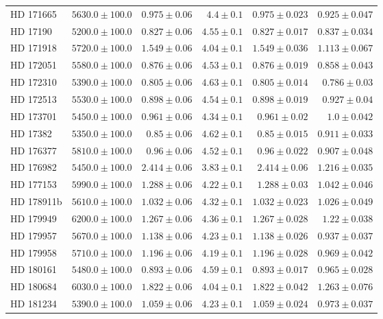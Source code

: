 \begin{longtable*}{lrrrrr}
HD 171665 & $5630.0\pm 100.0$ & $0.975\pm 0.06$ & $4.4\pm 0.1$ & $0.975\pm 0.023$ & $0.925\pm 0.047$ \\ 
HD 17190 & $5200.0\pm 100.0$ & $0.827\pm 0.06$ & $4.55\pm 0.1$ & $0.827\pm 0.017$ & $0.837\pm 0.034$ \\ 
HD 171918 & $5720.0\pm 100.0$ & $1.549\pm 0.06$ & $4.04\pm 0.1$ & $1.549\pm 0.036$ & $1.113\pm 0.067$ \\ 
HD 172051 & $5580.0\pm 100.0$ & $0.876\pm 0.06$ & $4.53\pm 0.1$ & $0.876\pm 0.019$ & $0.858\pm 0.043$ \\ 
HD 172310 & $5390.0\pm 100.0$ & $0.805\pm 0.06$ & $4.63\pm 0.1$ & $0.805\pm 0.014$ & $0.786\pm 0.03$ \\ 
HD 172513 & $5530.0\pm 100.0$ & $0.898\pm 0.06$ & $4.54\pm 0.1$ & $0.898\pm 0.019$ & $0.927\pm 0.04$ \\ 
HD 173701 & $5450.0\pm 100.0$ & $0.961\pm 0.06$ & $4.34\pm 0.1$ & $0.961\pm 0.02$ & $1.0\pm 0.042$ \\ 
HD 17382 & $5350.0\pm 100.0$ & $0.85\pm 0.06$ & $4.62\pm 0.1$ & $0.85\pm 0.015$ & $0.911\pm 0.033$ \\ 
HD 176377 & $5810.0\pm 100.0$ & $0.96\pm 0.06$ & $4.52\pm 0.1$ & $0.96\pm 0.022$ & $0.907\pm 0.048$ \\ 
HD 176982 & $5450.0\pm 100.0$ & $2.414\pm 0.06$ & $3.83\pm 0.1$ & $2.414\pm 0.06$ & $1.216\pm 0.035$ \\ 
HD 177153 & $5990.0\pm 100.0$ & $1.288\pm 0.06$ & $4.22\pm 0.1$ & $1.288\pm 0.03$ & $1.042\pm 0.046$ \\ 
HD 178911b & $5610.0\pm 100.0$ & $1.032\pm 0.06$ & $4.32\pm 0.1$ & $1.032\pm 0.023$ & $1.026\pm 0.049$ \\ 
HD 179949 & $6200.0\pm 100.0$ & $1.267\pm 0.06$ & $4.36\pm 0.1$ & $1.267\pm 0.028$ & $1.22\pm 0.038$ \\ 
HD 179957 & $5670.0\pm 100.0$ & $1.138\pm 0.06$ & $4.23\pm 0.1$ & $1.138\pm 0.026$ & $0.937\pm 0.037$ \\ 
HD 179958 & $5710.0\pm 100.0$ & $1.196\pm 0.06$ & $4.19\pm 0.1$ & $1.196\pm 0.028$ & $0.969\pm 0.042$ \\ 
HD 180161 & $5480.0\pm 100.0$ & $0.893\pm 0.06$ & $4.59\pm 0.1$ & $0.893\pm 0.017$ & $0.965\pm 0.028$ \\ 
HD 180684 & $6030.0\pm 100.0$ & $1.822\pm 0.06$ & $4.04\pm 0.1$ & $1.822\pm 0.042$ & $1.263\pm 0.076$ \\ 
HD 181234 & $5390.0\pm 100.0$ & $1.059\pm 0.06$ & $4.23\pm 0.1$ & $1.059\pm 0.024$ & $0.973\pm 0.037$ \\ 

\end{longtable*}
